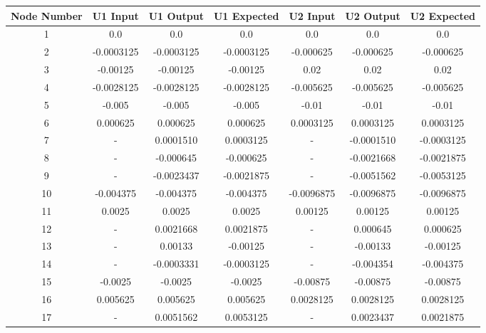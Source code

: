 \documentclass[12pt]{article}
\begin{document}
\begin{table}[H]

		\begin{tabular}{||c c c c c c c||} 
			\hline
			Node Number & U1 Input& U1 Output  & U1 Expected & U2 Input & U2 Output & U2 Expected\\ [0.8ex] 
			\hline\hline
			1 & 0.0 & 0.0 & 0.0 & 0.0 & 0.0 & 0.0  \\ 
			[0.8ex]
			\hline
			2 & -0.0003125 & -0.0003125 & -0.0003125 & -0.000625 & -0.000625 & -0.000625  \\ 
			[0.8ex]
			\hline
			3 & -0.00125 & -0.00125 & -0.00125 & 0.02 & 0.02 & 0.02  \\ 
			[0.8ex]
			\hline
			4 & -0.0028125 & -0.0028125 & -0.0028125 & -0.005625 & -0.005625 & -0.005625  \\ 
			[0.8ex]
			\hline
			5 & -0.005 & -0.005 & -0.005 & -0.01 & -0.01 & -0.01 \\ 
			[0.8ex]
			\hline
			6 & 0.000625 & 0.000625 & 0.000625 & 0.0003125 & 0.0003125 & 0.0003125 \\ 
			[0.8ex]
			\hline
			\rowcolor{lightgray} 7 & - & 0.0001510 & 0.0003125 & - & -0.0001510 & -0.0003125 \\ 
			[0.8ex]
			\hline
			\rowcolor{lightgray} 8 & - & -0.000645 & -0.000625 & - & -0.0021668 & -0.0021875 \\ 
			[0.8ex]
			\hline	
			\rowcolor{lightgray} 9 & - & -0.0023437 & -0.0021875 & - & -0.0051562 & -0.0053125  \\ 
			[0.8ex]
			\hline
			10 & -0.004375 & -0.004375 & -0.004375 & -0.0096875 & -0.0096875 & -0.0096875  \\ 
			[0.8ex]
			\hline
			11 & 0.0025 & 0.0025 & 0.0025 & 0.00125 & 0.00125 & 0.00125  \\ 
			[0.8ex]
			\hline
			\rowcolor{lightgray} 12 & - & 0.0021668 & 0.0021875 & - & 0.000645 & 0.000625  \\ 
			[0.8ex]
			\hline
			\rowcolor{lightgray} 13 & - & 0.00133 & -0.00125 & - & -0.00133 & -0.00125  \\ 
			[0.8ex]
			\hline
			\rowcolor{lightgray} 14 & - & -0.0003331 & -0.0003125 & - & -0.004354 & -0.004375 \\ 
			[0.8ex]
			\hline
			15 & -0.0025 & -0.0025 & -0.0025 & -0.00875 & -0.00875 & -0.00875 \\ 
			[0.8ex]	
			\hline
			16 & 0.005625 & 0.005625 & 0.005625 & 0.0028125 & 0.0028125 & 0.0028125 \\ 
			[0.8ex]
			\hline	
			\rowcolor{lightgray} 17 & - & 0.0051562 & 0.0053125 & - & 0.0023437 & 0.0021875  \\ 
			[0.8ex]
			\hline 
			

\end{tabular}
\end{table}
\end{document}
